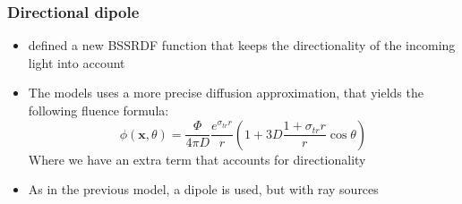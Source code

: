 \documentclass{beamer}
\newcommand{\x}{\mathbf{x}}
\begin{document}
\begin{frame}
    \frametitle{Directional dipole}
		\vspace{0.3cm}
			\begin{itemize}
				\item \citep{IMM2013-06646} defined a new BSSRDF function that keeps the directionality of the incoming light into account
				\item The models uses a more precise diffusion approximation, that yields the following fluence formula:
				\begin{equation*}
\phi(\x, \theta) = \frac{\Phi}{4\pi D} \frac{e^{\sigma_{tr} r}}{r} \left( 1 + 3D\frac{1 + \sigma_{tr} r}{r}\cos\theta\right)
\end{equation*}
			Where we have an extra term that accounts for directionality
			\item As in the previous model, a dipole is used, but with ray sources
	\end{itemize}

\end{frame}
\end{document}
